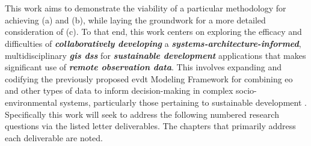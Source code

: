 \section{}

This work aims to demonstrate the viability of a particular methodology for achieving (a) and (b), while laying the groundwork for a more detailed consideration of (c). To that end, this work centers on exploring the efficacy and difficulties of \textbf{\textit{collaboratively developing}} a \textbf{\textit{systems-architecture-informed}}, multidisciplinary \textbf{\textit{\ac{gis} \ac{dss}}} for \textbf{\textit{sustainable development}} applications that makes significant use of \textbf{\textit{remote observation data}}. This involves expanding and codifying the previously proposed \ac{evdt} Modeling Framework  for combining \ac{eo} and other types of data to inform decision-making in complex socio-environmental systems, particularly those pertaining to sustainable development \cite{reidCombiningSocialEnvironmental2019}. Specifically this work will seek to address the following numbered research questions via the listed letter deliverables. The chapters that primarily address each deliverable are noted.


